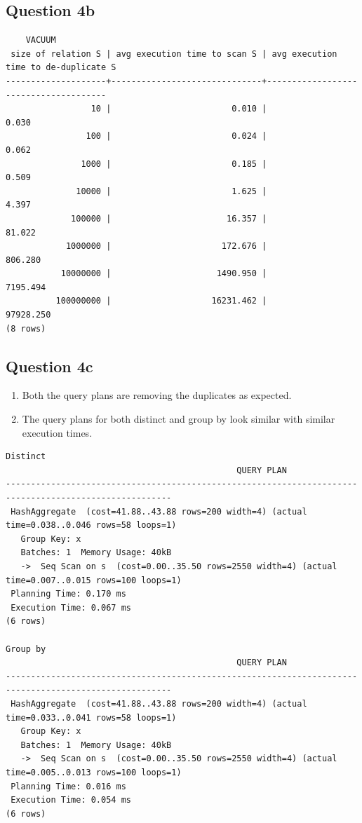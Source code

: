 \documentclass{article}
\begin{document}
  \subsection*{Question 4b}
  \begin{verbatim}
    VACUUM
 size of relation S | avg execution time to scan S | avg execution time to de-duplicate S 
--------------------+------------------------------+--------------------------------------
                 10 |                        0.010 |                                0.030
                100 |                        0.024 |                                0.062
               1000 |                        0.185 |                                0.509
              10000 |                        1.625 |                                4.397
             100000 |                       16.357 |                               81.022
            1000000 |                      172.676 |                              806.280
           10000000 |                     1490.950 |                             7195.494
          100000000 |                    16231.462 |                            97928.250
(8 rows)
  \end{verbatim}
  \subsection*{Question 4c}
  \begin{enumerate}
    \item Both the query plans are removing the duplicates as expected.
    \item The query plans for both distinct and group by look similar with similar execution times.
  \end{enumerate}
  {\scriptsize
  \begin{verbatim}
Distinct
                                              QUERY PLAN                                               
-------------------------------------------------------------------------------------------------------
 HashAggregate  (cost=41.88..43.88 rows=200 width=4) (actual time=0.038..0.046 rows=58 loops=1)
   Group Key: x
   Batches: 1  Memory Usage: 40kB
   ->  Seq Scan on s  (cost=0.00..35.50 rows=2550 width=4) (actual time=0.007..0.015 rows=100 loops=1)
 Planning Time: 0.170 ms
 Execution Time: 0.067 ms
(6 rows)

Group by
                                              QUERY PLAN                                               
-------------------------------------------------------------------------------------------------------
 HashAggregate  (cost=41.88..43.88 rows=200 width=4) (actual time=0.033..0.041 rows=58 loops=1)
   Group Key: x
   Batches: 1  Memory Usage: 40kB
   ->  Seq Scan on s  (cost=0.00..35.50 rows=2550 width=4) (actual time=0.005..0.013 rows=100 loops=1)
 Planning Time: 0.016 ms
 Execution Time: 0.054 ms
(6 rows)
  \end{verbatim}
  }
\end{document}
